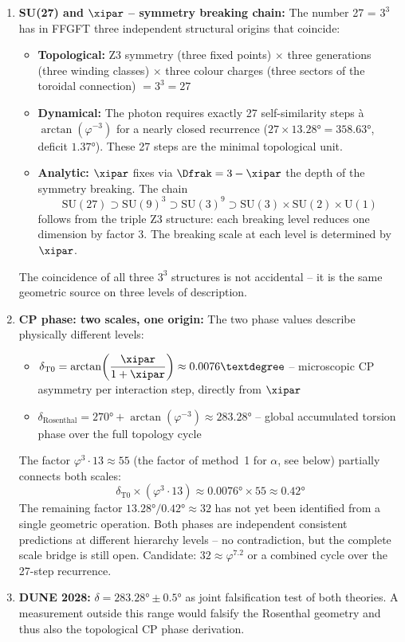 \begin{enumerate}
  \item \textbf{SU(27) and $\xipar$ -- symmetry breaking chain:}
  The number 27 = $3^3$ has in FFGFT three independent structural origins that coincide:
  \begin{itemize}[noitemsep]
    \item \textbf{Topological:} Z3 symmetry (three fixed points) $\times$ three generations (three winding classes) $\times$ three colour charges (three sectors of the toroidal connection) $= 3^3 = 27$
    \item \textbf{Dynamical:} The photon requires exactly 27 self-similarity steps à $\arctan(\varphi^{-3})$ for a nearly closed recurrence ($27 \times 13.28° = 358.63°$, deficit $1.37°$). These 27 steps are the minimal topological unit.
    \item \textbf{Analytic:} $\xipar$ fixes via $\Dfrak = 3 - \xipar$ the depth of the symmetry breaking. The chain
    \[
      \mathrm{SU}(27) \supset \mathrm{SU}(9)^3 \supset \mathrm{SU}(3)^9 \supset \mathrm{SU}(3) \times \mathrm{SU}(2) \times \mathrm{U}(1)
    \]
    follows from the triple Z3 structure: each breaking level reduces one dimension by factor 3. The breaking scale at each level is determined by $\xipar$.
  \end{itemize}
  The coincidence of all three $3^3$ structures is not accidental -- it is the same geometric source on three levels of description.

  \item \textbf{CP phase: two scales, one origin:}
  The two phase values describe physically different levels:
  \begin{itemize}[noitemsep]
    \item $\delta_{\text{T0}} = \arctan\!\left(\dfrac{\xipar}{1+\xipar}\right) \approx 0.0076°$ -- microscopic CP asymmetry per interaction step, directly from $\xipar$
    \item $\delta_{\text{Rosenthal}} = 270° + \arctan(\varphi^{-3}) \approx 283.28°$ -- global accumulated torsion phase over the full topology cycle
  \end{itemize}

  The factor $\varphi^3 \cdot 13 \approx 55$ (the factor of method~1 for $\alpha$, see below) partially connects both scales:
  \[
    \delta_{\text{T0}} \times (\varphi^3 \cdot 13) \approx 0.0076° \times 55 \approx 0.42°
  \]
  The remaining factor $13.28° / 0.42° \approx 32$ has not yet been identified from a single geometric operation. Both phases are independent consistent predictions at different hierarchy levels -- no contradiction, but the complete scale bridge is still open. Candidate: $32 \approx \varphi^{7.2}$ or a combined cycle over the 27-step recurrence.

  \item \textbf{DUNE 2028:} $\delta = 283.28° \pm 0.5°$ as joint falsification test of both theories. A measurement outside this range would falsify the Rosenthal geometry and thus also the topological CP phase derivation.

\end{enumerate}

